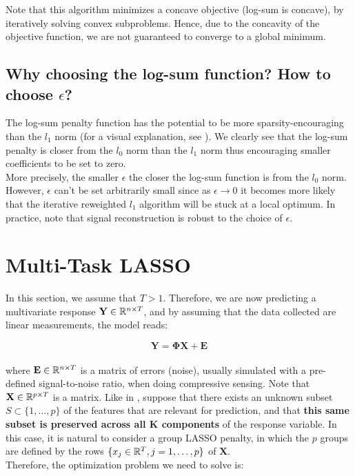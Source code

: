 \documentclass[a4paper,10pt]{article}
\theoremstyle{definition}
\begin{document}
\vskip 0.2in

Note that this algorithm minimizes a concave objective (log-sum is concave), by iteratively solving convex subproblems. Hence, due to the concavity of the objective function, we
are not guaranteed to converge to a global minimum.

\subsection*{Why choosing the log-sum function? How to choose $\epsilon$?}

The log-sum penalty function has the potential to be more sparsity-encouraging than the $l_1$ norm (for a visual explanation, see \cite{Candes_Wakin_Boyd08}). We clearly see
that the log-sum penalty is closer from the $l_0$ norm than the $l_1$ norm thus encouraging smaller coefficients to be set to zero.
\\
More precisely, the smaller $\epsilon$ the closer the log-sum function is from the $l_0$ norm. However, $\epsilon$ can't be set arbitrarily small since as $\epsilon \rightarrow 0$ it
becomes more likely that the iterative reweighted $l_1$ algorithm will be stuck at a local optimum. In practice, note that signal reconstruction is robust to the choice of $\epsilon$.

\section{Multi-Task LASSO}
\label{section_4}

In this section, we assume that $T > 1$. Therefore, we are now predicting a multivariate response $\mathbf{Y}\in \mathbb{R}^{n \times T}$, and by assuming that the data collected are linear measurements, the model reads:

\begin{equation*}
    \mathbf{Y} = \mathbf{\Phi}\mathbf{X} + \mathbf{E}
\end{equation*}
\\
where $\mathbf{E} \in \mathbb{R}^{n \times T}$ is a matrix of errors (noise), usually simulated with a pre-defined signal-to-noise ratio, when doing compressive sensing. Note that $\mathbf{X} \in \mathbb{R}^{p \times T}$ is a matrix.
Like in , suppose that there exists an unknown subset $S \subset  \{1, \dots, p\}$ of the features that are relevant for prediction, and that \textbf{this same subset is preserved across all K components} of the response
variable. In this case, it is natural to consider a group LASSO penalty, in which the $p$ groups are defined by the rows $\{x_{j} \in \mathbb{R}^T, j=1,\dots,p\}$ of $\mathbf{X}$.
\\
Therefore, the optimization problem we need to solve is:
\end{document}
